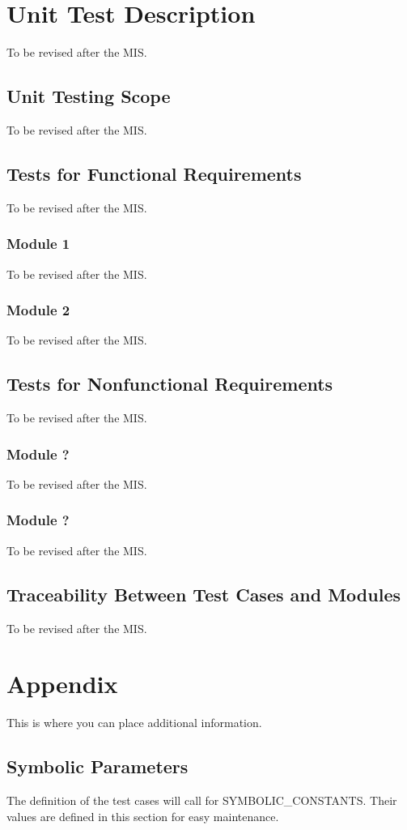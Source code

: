 \documentclass[12pt, titlepage]{article}
\begin{document}
\section{Unit Test Description}
To be revised after the MIS.
\subsection{Unit Testing Scope}
To be revised after the MIS.
\subsection{Tests for Functional Requirements}
To be revised after the MIS.
\subsubsection{Module 1}
To be revised after the MIS.
\subsubsection{Module 2}
To be revised after the MIS.
\subsection{Tests for Nonfunctional Requirements}
To be revised after the MIS.
\subsubsection{Module ?}
To be revised after the MIS.
\subsubsection{Module ?}
To be revised after the MIS.
\subsection{Traceability Between Test Cases and Modules}
To be revised after the MIS.




\newpage

\section{Appendix}

This is where you can place additional information.

\subsection{Symbolic Parameters}
The definition of the test cases will call for SYMBOLIC\_CONSTANTS.
Their values are defined in this section for easy maintenance.\\\\
\end{document}
